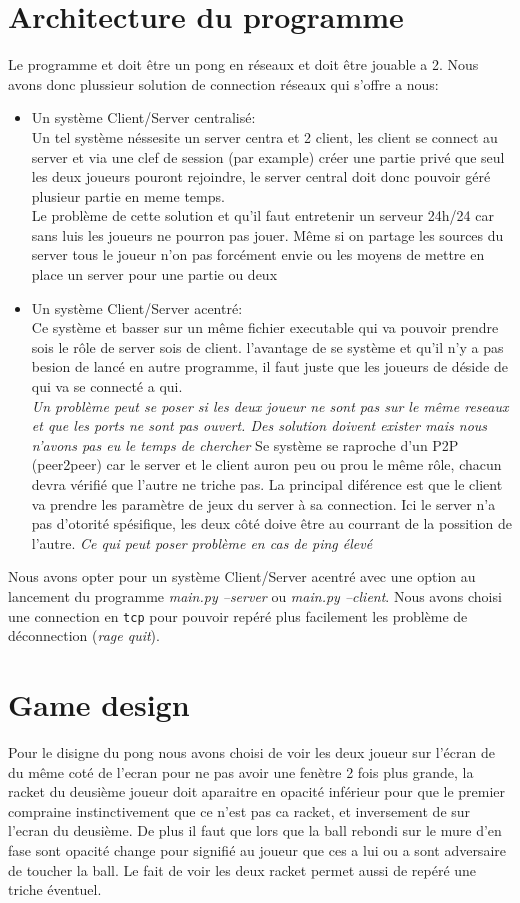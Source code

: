 \documentclass[12pt]{report}
\begin{document}
\chapter{Architecture du programme}
Le programme et doit être un pong en réseaux et doit être jouable a 2.
Nous avons donc plussieur solution de connection réseaux qui s'offre a
nous:
\begin{itemize}
\item Un système Client/Server centralisé: \\
  Un tel système néssesite un server centra et 2 client, les client se
  connect au server et via une clef de session (par example) créer une partie
  privé que seul les deux joueurs pouront rejoindre, le server central doit
  donc pouvoir géré plusieur partie en meme temps. \\
  Le problème de cette solution et qu'il faut entretenir un serveur 24h/24
  car sans luis les joueurs ne pourron pas jouer.
  Même si on partage les sources du server tous le joueur n'on pas forcément
  envie ou les moyens de mettre en place un server pour une partie ou deux
\item Un système Client/Server acentré: \\
  Ce système et basser sur un même fichier executable qui va pouvoir prendre
  sois le rôle de server sois de client. l'avantage de se système et qu'il n'y
  a pas besion de lancé en autre programme, il faut juste que les joueurs de
  déside de qui va se connecté a qui. \\
  \textit{Un problème peut se poser si les deux joueur ne sont pas sur le même
    reseaux et que les ports ne sont pas ouvert. Des solution doivent exister
    mais nous n'avons pas eu le temps de chercher}
  Se système se raproche d'un P2P (peer2peer) car le server et le client
  auron peu ou prou le même rôle, chacun devra vérifié que l'autre ne triche
  pas. La principal diférence est que le client va prendre les paramètre de
  jeux du server à sa connection.
  Ici le server n'a pas d'otorité spésifique, les deux côté doive être au
  courrant de la possition de l'autre.
  \textit{Ce qui peut poser problème en cas de ping élevé}
\end{itemize}
Nous avons opter pour un système Client/Server acentré avec une option au
lancement du programme \textit{main.py --server} ou \textit{main.py --client}.
Nous avons choisi une connection en \texttt{tcp} pour pouvoir repéré plus
facilement les problème de déconnection (\textit{rage quit}).

\chapter{Game design}
Pour le disigne du pong nous avons choisi de voir les deux joueur sur l'écran
de du même coté de l'ecran pour ne pas avoir une fenètre 2 fois plus grande,
la racket du deusième joueur doit aparaitre en opacité inférieur pour que
le premier compraine instinctivement que ce n'est pas ca racket, et inversement
de sur l'ecran du deusième.
De plus il faut que lors que la ball rebondi sur le mure d'en fase sont opacité
change pour signifié au joueur que ces a lui ou a sont adversaire de toucher la
ball.
Le fait de voir les deux racket permet aussi de repéré une triche éventuel.
\end{document}
